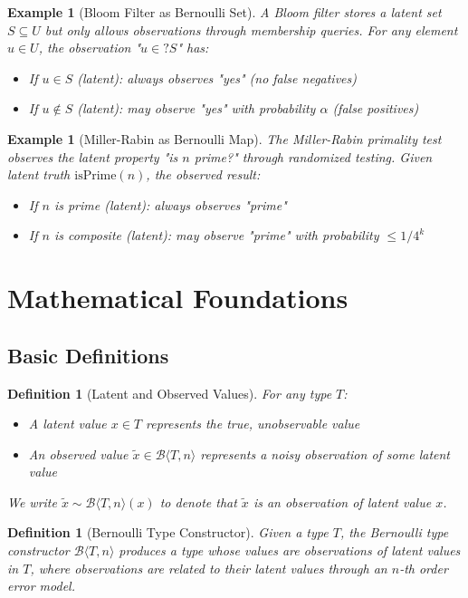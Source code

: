 \documentclass[11pt,final,hidelinks]{article}
\newtheorem{definition}[theorem]{Definition}
\newtheorem{example}[theorem]{Example}
\newcommand{\bernoulli}[2]{\mathcal{B}\langle #1, #2 \rangle}
\begin{document}
\begin{example}[Bloom Filter as Bernoulli Set]
A Bloom filter stores a latent set $S \subseteq U$ but only allows observations through membership queries. For any element $u \in U$, the observation "$u \in? S$" has:
\begin{itemize}
    \item If $u \in S$ (latent): always observes "yes" (no false negatives)
    \item If $u \notin S$ (latent): may observe "yes" with probability $\alpha$ (false positives)
\end{itemize}
\end{example}

\begin{example}[Miller-Rabin as Bernoulli Map]
The Miller-Rabin primality test observes the latent property "is $n$ prime?" through randomized testing. Given latent truth $\text{isPrime}(n)$, the observed result:
\begin{itemize}
    \item If $n$ is prime (latent): always observes "prime" 
    \item If $n$ is composite (latent): may observe "prime" with probability $\leq 1/4^k$
\end{itemize}
\end{example}

\section{Mathematical Foundations}

\subsection{Basic Definitions}

\begin{definition}[Latent and Observed Values]
For any type $T$:
\begin{itemize}
    \item A \emph{latent value} $x \in T$ represents the true, unobservable value
    \item An \emph{observed value} $\tilde{x} \in \bernoulli{T}{n}$ represents a noisy observation of some latent value
\end{itemize}
We write $\tilde{x} \sim \bernoulli{T}{n}(x)$ to denote that $\tilde{x}$ is an observation of latent value $x$.
\end{definition}

\begin{definition}[Bernoulli Type Constructor]
Given a type $T$, the Bernoulli type constructor $\bernoulli{T}{n}$ produces a type whose values are observations of latent values in $T$, where observations are related to their latent values through an $n$-th order error model.
\end{definition}
\end{document}
